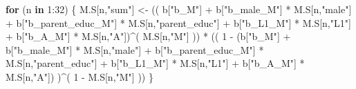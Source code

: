 \documentclass[
]{book}
\newenvironment{Shaded}{\begin{snugshade}}{\end{snugshade}}
\newcommand{\ControlFlowTok}[1]{\textcolor[rgb]{0.13,0.29,0.53}{\textbf{#1}}}
\newcommand{\DecValTok}[1]{\textcolor[rgb]{0.00,0.00,0.81}{#1}}
\newcommand{\NormalTok}[1]{#1}
\newcommand{\OtherTok}[1]{\textcolor[rgb]{0.56,0.35,0.01}{#1}}
\newcommand{\SpecialCharTok}[1]{\textcolor[rgb]{0.00,0.00,0.00}{#1}}
\newcommand{\StringTok}[1]{\textcolor[rgb]{0.31,0.60,0.02}{#1}}
\begin{document}
\begin{Shaded}
\begin{Highlighting}[]
  \ControlFlowTok{for}\NormalTok{ (n }\ControlFlowTok{in} \DecValTok{1}\SpecialCharTok{:}\DecValTok{32}\NormalTok{) \{}
\NormalTok{    M.S[n,}\StringTok{"sum"}\NormalTok{] }\OtherTok{\textless{}{-}}\NormalTok{ (( b[}\StringTok{"b\_M"}\NormalTok{] }\SpecialCharTok{+}                                                              
\NormalTok{                         b[}\StringTok{"b\_male\_M"}\NormalTok{] }\SpecialCharTok{*}\NormalTok{ M.S[n,}\StringTok{"male"}\NormalTok{] }\SpecialCharTok{+} 
\NormalTok{                         b[}\StringTok{"b\_parent\_educ\_M"}\NormalTok{] }\SpecialCharTok{*}\NormalTok{ M.S[n,}\StringTok{"parent\_educ"}\NormalTok{] }\SpecialCharTok{+} 
\NormalTok{                         b[}\StringTok{"b\_L1\_M"}\NormalTok{] }\SpecialCharTok{*}\NormalTok{ M.S[n,}\StringTok{"L1"}\NormalTok{] }\SpecialCharTok{+}
\NormalTok{                         b[}\StringTok{"b\_A\_M"}\NormalTok{] }\SpecialCharTok{*}\NormalTok{ M.S[n,}\StringTok{"A"}\NormalTok{])}\SpecialCharTok{\^{}}\NormalTok{( M.S[n,}\StringTok{"M"}\NormalTok{] )) }\SpecialCharTok{*}
\NormalTok{      (( }\DecValTok{1} \SpecialCharTok{{-}}\NormalTok{ (b[}\StringTok{"b\_M"}\NormalTok{] }\SpecialCharTok{+} 
\NormalTok{                b[}\StringTok{"b\_male\_M"}\NormalTok{] }\SpecialCharTok{*}\NormalTok{ M.S[n,}\StringTok{"male"}\NormalTok{] }\SpecialCharTok{+} 
\NormalTok{                b[}\StringTok{"b\_parent\_educ\_M"}\NormalTok{] }\SpecialCharTok{*}\NormalTok{ M.S[n,}\StringTok{"parent\_educ"}\NormalTok{] }\SpecialCharTok{+} 
\NormalTok{                b[}\StringTok{"b\_L1\_M"}\NormalTok{] }\SpecialCharTok{*}\NormalTok{ M.S[n,}\StringTok{"L1"}\NormalTok{] }\SpecialCharTok{+}
\NormalTok{                b[}\StringTok{"b\_A\_M"}\NormalTok{] }\SpecialCharTok{*}\NormalTok{ M.S[n,}\StringTok{"A"}\NormalTok{]) )}\SpecialCharTok{\^{}}\NormalTok{( }\DecValTok{1} \SpecialCharTok{{-}}\NormalTok{ M.S[n,}\StringTok{"M"}\NormalTok{] )) }
\NormalTok{    \}}
  

\end{Highlighting}
\end{Shaded}
\end{document}
